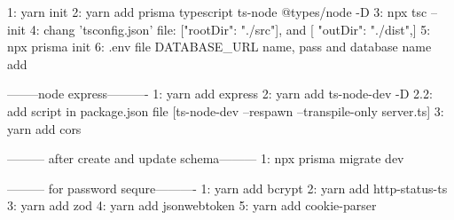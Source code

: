 1: yarn init
2: yarn add prisma typescript ts-node @types/node -D
3: npx tsc --init
4: chang 'tsconfig.json' file: ["rootDir": "./src"],   and [ "outDir": "./dist",]
5: npx prisma init
6: .env file DATABASE_URL name, pass and database name add



--------node express----------
1: yarn add express
2: yarn add ts-node-dev -D
2.2: add script in package.json file [ts-node-dev --respawn --transpile-only server.ts]
3: yarn add cors

--------- after create and update schema---------
1: npx prisma migrate dev


--------- for password sequre----------
1: yarn add bcrypt
2: yarn add http-status-ts
3: yarn add zod
4: yarn add jsonwebtoken
5: yarn add cookie-parser